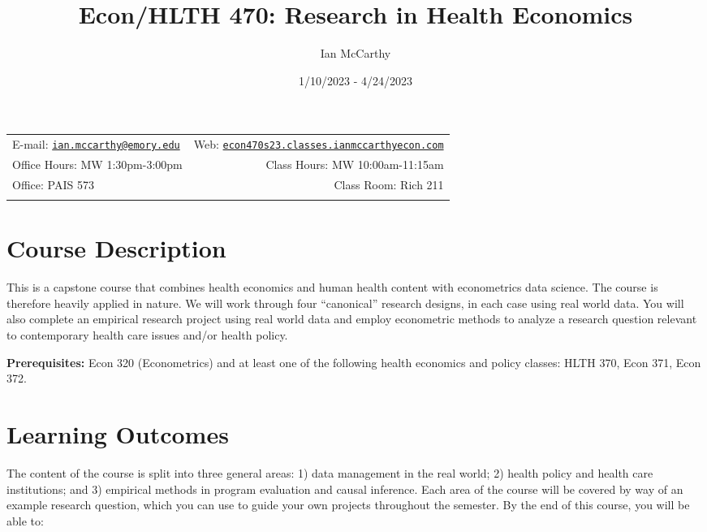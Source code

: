 \documentclass[11pt,]{article}
\title{Econ/HLTH 470: Research in Health Economics}
\author{Ian McCarthy}
\date{1/10/2023 - 4/24/2023}
\begin{document}
  

		\maketitle
		
	
		\thispagestyle{firststyle}



	\noindent \begin{tabular*}{\textwidth}{ @{\extracolsep{\fill}} lr @{\extracolsep{\fill}}}


E-mail: \texttt{\href{mailto:ian.mccarthy@emory.edu}{\nolinkurl{ian.mccarthy@emory.edu}}} & Web: \href{http://econ470s23.classes.ianmccarthyecon.com}{\tt econ470s23.classes.ianmccarthyecon.com}\\
Office Hours: MW 1:30pm-3:00pm  &  Class Hours: MW 10:00am-11:15am\\
Office: PAIS 573  & Class Room: Rich 211\\
	&  \\
	\hline
	\end{tabular*}
	
\vspace{2mm}
	


\hypertarget{course-description}{%
\section{Course Description}\label{course-description}}

This is a capstone course that combines health economics and human
health content with econometrics data science. The course is therefore
heavily applied in nature. We will work through four ``canonical''
research designs, in each case using real world data. You will also
complete an empirical research project using real world data and employ
econometric methods to analyze a research question relevant to
contemporary health care issues and/or health policy.

\textbf{Prerequisites:} Econ 320 (Econometrics) and at least one of the
following health economics and policy classes: HLTH 370, Econ 371, Econ
372.

\hypertarget{learning-outcomes}{%
\section{Learning Outcomes}\label{learning-outcomes}}

The content of the course is split into three general areas: 1) data
management in the real world; 2) health policy and health care
institutions; and 3) empirical methods in program evaluation and causal
inference. Each area of the course will be covered by way of an example
research question, which you can use to guide your own projects
throughout the semester. By the end of this course, you will be able to:
\end{document}
